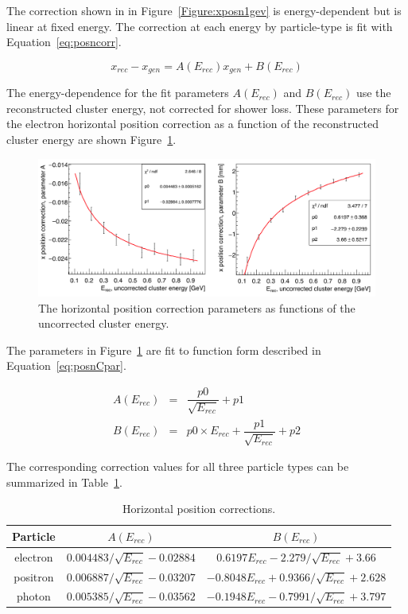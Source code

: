 The correction shown in in Figure~\ref{Figure:xposn1gev} is energy-dependent but is linear at fixed energy. The correction at each energy by particle-type is fit with Equation~\eqref{eq:posncorr}. 

\begin{equation}
\label{eq:posncorr}
x_{rec} - x_{gen} = A(E_{rec}) x_{gen} + B(E_{rec})
\end{equation}

The energy-dependence for the fit parameters $A(E_{rec})$ and $B(E_{rec})$ use the reconstructed cluster energy, not corrected for shower loss. These parameters for the electron horizontal position correction as a function of the reconstructed cluster energy are shown Figure~\ref{Figure:xposcorrPar}.

\begin{figure}[H]
  \centering
      \includegraphics[width=1.0\textwidth]{pics/performance/xposcorrPar.png}
  \caption[Horizontal position correction dependence for electrons]{The horizontal position correction parameters as functions of the uncorrected cluster energy.}
  \label{Figure:xposcorrPar}
\end{figure}

The parameters in Figure~\ref{Figure:xposcorrPar} are fit to function form described in Equation~\eqref{eq:posnCpar}.

\begin{eqnarray*}
\label{eq:posnCpar}
A(E_{rec}) & = & \dfrac{p0}{\sqrt{E_{rec}}}+p1\\
B(E_{rec}) & = & p0\times E_{rec} +\dfrac{p1}{\sqrt{E_{rec}}}+p2
\end{eqnarray*}

The corresponding correction values for all three particle types can be summarized in Table~\ref{tab:horizPosCorr}.

\begin{table}[H]
\caption{Horizontal position corrections.}
\label{tab:horizPosCorr}
\centering
\begin{tabular}{|c|c|c|}
\toprule
Particle & $A(E_{rec})$ & $B(E_{rec})$ \\
\midrule
electron & $0.004483/\sqrt{E_{rec}}-0.02884$ & $0.6197E_{rec}-2.279/\sqrt{E_{rec}}+3.66$ \\
positron & $0.006887/\sqrt{E_{rec}}-0.03207$ & $-0.8048E_{rec}+0.9366/\sqrt{E_{rec}}+2.628$ \\
photon & $0.005385/\sqrt{E_{rec}}-0.03562$ & $-0.1948E_{rec}-0.7991/\sqrt{E_{rec}}+3.797$ \\
\bottomrule
\end{tabular}
\end{table}

